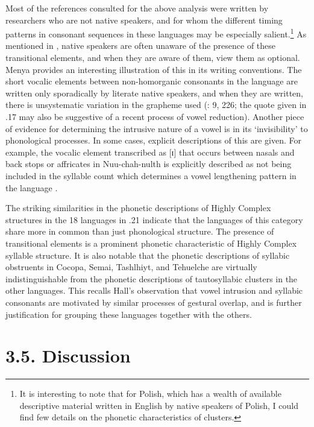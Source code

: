   Most of the references consulted for the above analysis were written by researchers who are not native speakers, and for whom the different timing patterns in consonant sequences in these languages may be especially salient.\footnote{ \textrm{It is interesting to note that for Polish, which has a wealth of available descriptive material written in English by native speakers of Polish, I could find few details on the phonetic characteristics of clusters.}} As mentioned in , native speakers are often unaware of the presence of these transitional elements, and when they are aware of them, view them as optional. Menya provides an interesting illustration of this in its writing conventions. The short vocalic elements between non-homorganic consonants in the language are written only sporadically by literate native speakers, and when they are written, there is unsystematic variation in the grapheme used (\citealt{Whitehead2004}: 9, 226; the quote given in .17 may also be suggestive of a recent process of vowel reduction). Another piece of evidence for determining the intrusive nature of a vowel is in its ‘invisibility’ to phonological processes. In some cases, explicit descriptions of this are given. For example, the vocalic element transcribed as [ɪ] that occurs between nasals and back stops or affricates in Nuu-chah-nulth is explicitly described as not being included in the syllable count which determines a vowel lengthening pattern in the language \citep[27]{Rose1981}.

  The striking similarities in the phonetic descriptions of Highly Complex structures in the 18 languages in .21 indicate that the languages of this category share more in common than just phonological structure. The presence of transitional elements is a prominent phonetic characteristic of Highly Complex syllable structure. It is also notable that the phonetic descriptions of syllabic obstruents in Cocopa, Semai, Tashlhiyt, and Tehuelche are virtually indistinguishable from the phonetic descriptions of tautosyllabic clusters in the other languages. This recalls Hall’s observation that vowel intrusion and syllabic consonants are motivated by similar processes of gestural overlap, and is further justification for grouping these languages together with the others.

\section{3.5. Discussion}

